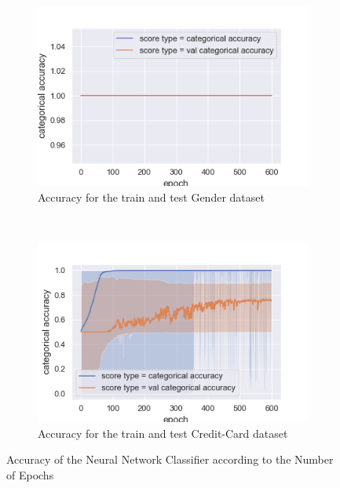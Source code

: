 \documentclass[10pt]{article}
\begin{document}
		\paragraph*{}
			\begin{figure}[h]
				\centering
				\begin{subfigure}[]{0.45\columnwidth}
					\centering
					\includegraphics[width=\linewidth]{../graphics/per_gender_epoch_score_type_score_type_full.png}
					\caption{Accuracy for the train and test Gender dataset}
					\label{nn:g_train_vs_test}
				\end{subfigure}
				~
				\begin{subfigure}[]{0.45\columnwidth}
					\centering
					\includegraphics[width=\linewidth]{../graphics/per_creditcard_epoch_score_type_score_type_full.png}
					\caption{Accuracy for the train and test Credit-Card dataset}
					\label{nn:cc_train_vs_test}
				\end{subfigure}
				\caption{Accuracy of the Neural Network Classifier according to the Number of Epochs}
				\label{nn:train_vs_test}
			\end{figure}
\end{document}

